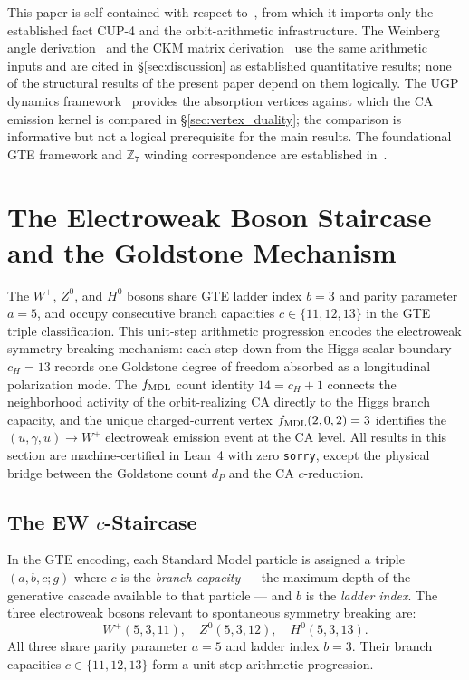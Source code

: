 \documentclass[11pt]{article}
\theoremstyle{remark}
\newcommand{\cH}{c_H}
\begin{document}
This paper is self-contained with respect to~\cite{SpivackCompUniversality},
from which it imports only the established fact CUP-4 and the orbit-arithmetic
infrastructure.  The Weinberg angle derivation~\cite{SpivackWeinberg} and the
CKM matrix derivation~\cite{SpivackCKM} use the same arithmetic inputs and
are cited in \S\ref{sec:discussion} as established quantitative results;
none of the structural results of the present paper depend on them logically.
The UGP dynamics framework~\cite{Spivack2026_UGPDynamics} provides the
absorption vertices against which the CA emission kernel is compared in
\S\ref{sec:vertex_duality}; the comparison is informative but not a logical
prerequisite for the main results.
The foundational GTE framework and $\mathbb{Z}_7$ winding correspondence are
established in~\cite{Spivack2026_SM_UGP}.

\section{The Electroweak Boson Staircase and the Goldstone Mechanism}
\label{sec:ew_staircase}

The $W^+$, $Z^0$, and $H^0$ bosons share GTE ladder index $b = 3$ and parity
parameter $a = 5$, and occupy consecutive branch capacities $c \in \{11, 12, 13\}$
in the GTE triple classification.
This unit-step arithmetic progression encodes the electroweak symmetry breaking
mechanism: each step down from the Higgs scalar boundary $\cH = 13$ records
one Goldstone degree of freedom absorbed as a longitudinal polarization mode.
The $f_{\rm MDL}$ count identity $14 = \cH + 1$ connects the neighborhood
activity of the orbit-realizing CA directly to the Higgs branch capacity,
and the unique charged-current vertex $f_{\rm MDL}(2,0,2) = 3$ identifies the
$(u, \gamma, u) \to W^+$ electroweak emission event at the CA level.
All results in this section are machine-certified in Lean~4 with zero
\texttt{sorry}, except the physical bridge between the Goldstone count $d_P$
and the CA $c$-reduction.

\subsection{The EW \texorpdfstring{$c$}{c}-Staircase}
\label{sec:ew_staircase_arithmetic}

In the GTE encoding, each Standard Model particle is assigned a triple $(a, b, c; g)$ where
$c$ is the \emph{branch capacity} --- the maximum depth of the generative cascade available to
that particle --- and $b$ is the \emph{ladder index}.
The three electroweak bosons relevant to spontaneous symmetry breaking are:
\[
W^+(5,3,11),\quad Z^0(5,3,12),\quad H^0(5,3,13).
\]
All three share parity parameter $a = 5$ and ladder index $b = 3$.
Their branch capacities $c \in \{11,12,13\}$ form a unit-step arithmetic progression.
\end{document}
